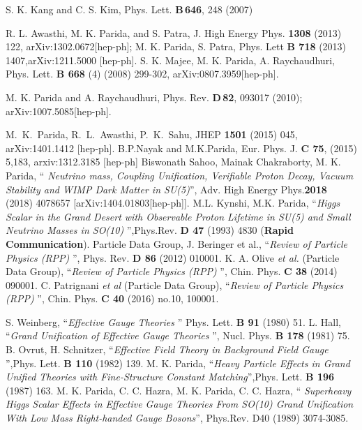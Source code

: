 \documentclass[a4paper,11pt]{article}
\begin{document}
\begin{thebibliography}{99}
S. K. Kang and C. S. Kim, Phys. Lett. {\bf B\,646}, 248 (2007)       

R. L. Awasthi, M. K. Parida, and  S. Patra, J. High
Energy Phys. {\bf 1308} (2013) 122, arXiv:1302.0672[hep-ph];
M. K. Parida, S. Patra, Phys. Lett {\bf B 718} (2013)
1407,arXiv:1211.5000 [hep-ph]. 
 S. K. Majee, M. K. Parida, A. Raychaudhuri,
  Phys. Lett. {\bf B 668 }(4) (2008) 299-302, arXiv:0807.3959[hep-ph].

 M. K. Parida and A. Raychaudhuri, Phys. Rev. {\bf D\,82}, 093017 (2010);  arXiv:1007.5085[hep-ph]. 
                 
 M.~K.~Parida, R.~L.~Awasthi, P.~K.~Sahu, JHEP {\bf 1501} (2015) 045, arXiv:1401.1412 [hep-ph].
B.P.Nayak and M.K.Parida, Eur. Phys. J. {\bf C 75},  (2015) 5,183,
arxiv:1312.3185 [hep-ph]
 Biswonath Sahoo, Mainak Chakraborty, M. K. Parida, ``{\em
  Neutrino mass, Coupling Unification, Verifiable Proton Decay, Vacuum
  Stability and WIMP Dark Matter in SU(5)}'', Adv. High Energy
  Phys.{\bf 2018} (2018) 4078657 [arXiv:1404.01803[hep-ph]].
 M.L. Kynshi, M.K. Parida, ``{\em Higgs
  Scalar in the Grand Desert with Observable Proton Lifetime in SU(5)
  and Small Neutrino Masses in SO(10)  }'',Phys.Rev. {\bf D 47} (1993)
  4830 ({\bf Rapid Communication}).
 Particle Data Group,
 J. Beringer et al., ``{\em Review of Particle Physics (RPP) }'',
 Phys. Rev. {\bf D 86} (2012) 010001. 
 K. A. Olive {\em et al.} (Particle Data Group), ``{\em Review of Particle Physics (RPP) }'', Chin.
  Phys. {\bf C 38 } (2014) 090001. 
 C. Patrignani {\em et al} (Particle
  Data Group), ``{\em Review of Particle Physics (RPP) }'',
  Chin. Phys. {\bf C 40} (2016) no.10, 100001.

 S. Weinberg, ``{\em Effective Gauge Theories  }'' Phys. Lett. {\bf B  91 } (1980) 51.
 L. Hall, ``{\em Grand Unification of Effective Gauge Theories  }'', Nucl. Phys. {\bf B  178} (1981) 75.
 B. Ovrut, H. Schnitzer, ``{\em Effective Field Theory in Background Field Gauge }'',Phys. Lett. {\bf B 110} (1982) 139.
 M. K. Parida, ``{\em Heavy Particle Effects in Grand
  Unified Theories with Fine-Structure Constant
  Matching}'',Phys. Lett. {\bf B 196 } (1987) 163.
 M. K. Parida, C. C. Hazra,
M. K. Parida, C. C. Hazra, `` {\em Superheavy
  Higgs Scalar Effects in Effective Gauge Theories From SO(10) Grand
  Unification With Low Mass Right-handed Gauge Bosons}'',
  Phys.Rev. D40 (1989) 3074-3085.


\end{thebibliography}
\end{document}

